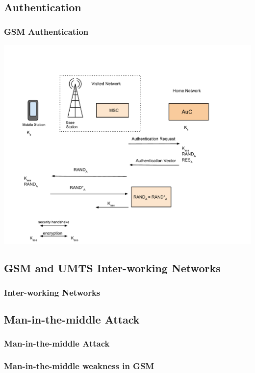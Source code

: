 \documentclass{beamer}
\begin{document}
\subsection{Authentication}
\begin{frame}
  \frametitle{GSM Authentication}
  \begin{center}
  \includegraphics[scale =.32]{GSMAuthentication.pdf}

  \end{center} 
\end{frame}

\subsection{GSM and UMTS Inter-working Networks}
\begin{frame}
	\frametitle{Inter-working Networks}
\end{frame}
\subsection{Man-in-the-middle Attack}
\begin{frame}
		\frametitle{Man-in-the-middle Attack}
		\end{frame}
		
		
		
\begin{frame}
	\frametitle{Man-in-the-middle weakness in GSM}
\end{frame}
\end{document}
